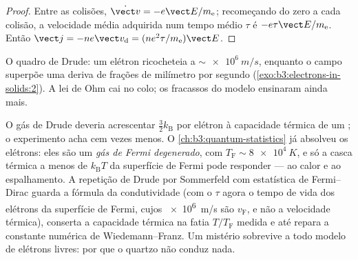 \begin{proof}
Entre as colisões, $\dot{\vect v} = -e\vect E/m_{\text{e}}$;
recomeçando do zero a cada colisão, a velocidade média adquirida num
tempo médio $\tau$ é $-e\tau\vect E/m_{\text{e}}$. Então $\vect j =
-ne\vect v_{\text{d}} = (ne^2\tau/m_{\text{e}})\vect E$.
\end{proof}

\begin{omfigure}

{\small O quadro de Drude: um elétron ricocheteia a
$\sim\qty{e6}{m/s}$, enquanto o campo superpõe uma deriva de
frações de milímetro por segundo
(\cref{exo:b3:electrons-in-solids:2}). A lei de Ohm cai no colo; os
fracassos do modelo ensinaram ainda mais.}
\end{omfigure}

\begin{remark}\label{rem:b3:electrons-in-solids:sommerfeld}
O gás de Drude deveria acrescentar $\tfrac32k_{\text{B}}$ por elétron à
capacidade térmica de um ; o experimento acha cem vezes menos.
O \cref{ch:b3:quantum-statistics} já absolveu os elétrons:
eles são um \emph{gás de Fermi degenerado}, com $T_{\text{F}} \sim
\qty{8e4}{K}$, e só a casca térmica a menos de
$k_{\text{B}}T$ da superfície de Fermi pode responder --- ao calor e
ao espalhamento. A repetição de Drude por Sommerfeld com estatística
de Fermi--Dirac guarda a fórmula da condutividade (com o $\tau$ agora o
tempo de vida dos elétrons da superfície de Fermi, cujos \qty{e6}{m/s}
são $v_{\text{F}}$, e não a velocidade térmica), conserta a capacidade
térmica na fatia $T/T_{\text{F}}$ medida e até repara a constante
numérica de Wiedemann--Franz. Um mistério sobrevive a todo modelo de
elétrons livres: por que o quartzo não conduz nada.
\end{remark}

